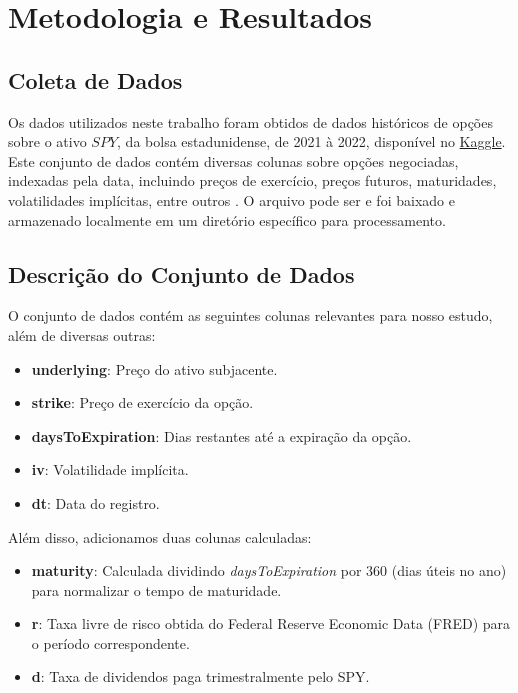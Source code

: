 \section{Metodologia e Resultados}

\subsection{Coleta de Dados}

Os dados utilizados neste trabalho foram obtidos de dados históricos de opções sobre o ativo $SPY$, da bolsa estadunidense, de 2021 à 2022, disponível no \href{https://www.kaggle.com/datasets/shawlu/option-spy-dataset-combinedcsv}{Kaggle}. Este conjunto de dados contém diversas colunas sobre opções negociadas, indexadas pela data, incluindo preços de exercício, preços futuros, maturidades, volatilidades implícitas, entre outros \citep{}. O arquivo pode ser e foi baixado e armazenado localmente em um diretório específico para processamento.

\subsection{Descrição do Conjunto de Dados}

O conjunto de dados contém as seguintes colunas relevantes para nosso estudo, além de diversas outras:
\begin{itemize}
	\item \textbf{underlying}: Preço do ativo subjacente.
	\item \textbf{strike}: Preço de exercício da opção.
	\item \textbf{daysToExpiration}: Dias restantes até a expiração da opção.
	\item \textbf{iv}: Volatilidade implícita.
	\item \textbf{dt}: Data do registro.
\end{itemize}

Além disso, adicionamos duas colunas calculadas:
\begin{itemize}
	\item \textbf{maturity}: Calculada dividindo \textit{daysToExpiration} por 360 (dias úteis no ano) para normalizar o tempo de maturidade.
	\item \textbf{r}: Taxa livre de risco obtida do Federal Reserve Economic Data (FRED) para o período correspondente.
	\item \textbf{d}: Taxa de dividendos paga trimestralmente pelo SPY.
\end{itemize}

